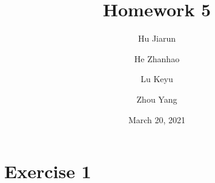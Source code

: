 \documentclass[12pt,oneside,a4paper]{article}
\title{Homework 5}          %
\author{Hu Jiarun \and He Zhanhao \and Lu Keyu \and Zhou Yang } %
\date{March 20, 2021}        %
\begin{document}
\maketitle              %
\tableofcontents        %
\thispagestyle{empty}   %





\newpage    %
\setcounter{page}{1}    %

\section{Exercise 1}    
\end{document}
